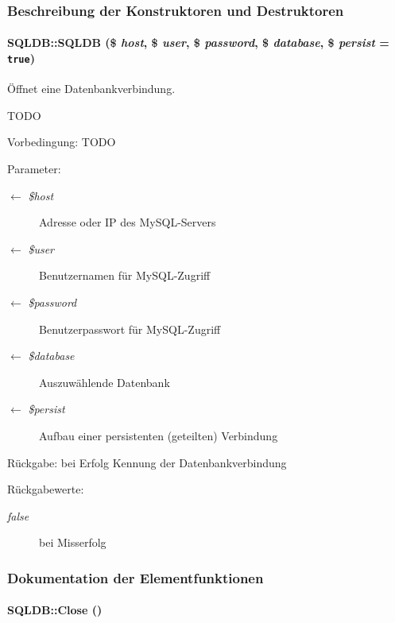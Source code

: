 \subsubsection{Beschreibung der Konstruktoren und Destruktoren}
\hypertarget{classSQLDB_069ba0502ed4bfedb72768a03ff6854d}{
\paragraph[SQLDB]{\setlength{\rightskip}{0pt plus 5cm}SQLDB::SQLDB (\$ {\em host}, \$ {\em user}, \$ {\em password}, \$ {\em database}, \$ {\em persist} = {\tt true})}\hfill}
\label{classSQLDB_069ba0502ed4bfedb72768a03ff6854d}


Öffnet eine Datenbankverbindung. 

TODO \begin{Desc}
\item[Vorbedingung:]TODO \end{Desc}
\begin{Desc}
\item[Parameter:]
\begin{description}
\item[\mbox{$\leftarrow$} {\em \$host}]Adresse oder IP des My\-SQL-Servers \item[\mbox{$\leftarrow$} {\em \$user}]Benutzernamen für My\-SQL-Zugriff \item[\mbox{$\leftarrow$} {\em \$password}]Benutzerpasswort für My\-SQL-Zugriff \item[\mbox{$\leftarrow$} {\em \$database}]Auszuwählende Datenbank \item[\mbox{$\leftarrow$} {\em \$persist}]Aufbau einer persistenten (geteilten) Verbindung \end{description}
\end{Desc}
\begin{Desc}
\item[R\"{u}ckgabe:]bei Erfolg Kennung der Datenbankverbindung \end{Desc}
\begin{Desc}
\item[R\"{u}ckgabewerte:]
\begin{description}
\item[{\em false}]bei Misserfolg \end{description}
\end{Desc}


\subsubsection{Dokumentation der Elementfunktionen}
\hypertarget{classSQLDB_0e82206260d6fc4d0eaec32022125048}{
\paragraph[Close]{\setlength{\rightskip}{0pt plus 5cm}SQLDB::Close ()}\hfill}
\label{classSQLDB_0e82206260d6fc4d0eaec32022125048}


